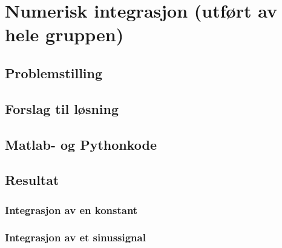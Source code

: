 \documentclass[./main.tex]{subfiles}
\begin{document}
\chapter{Numerisk integrasjon (utført av hele gruppen) }\label{kap:integrasjon}

\section{Problemstilling}

\section{Forslag til løsning}

\section{Matlab- og Pythonkode}

\section{Resultat}

\subsection{Integrasjon av en konstant}

\subsection{Integrasjon av et sinussignal}
\end{document}
